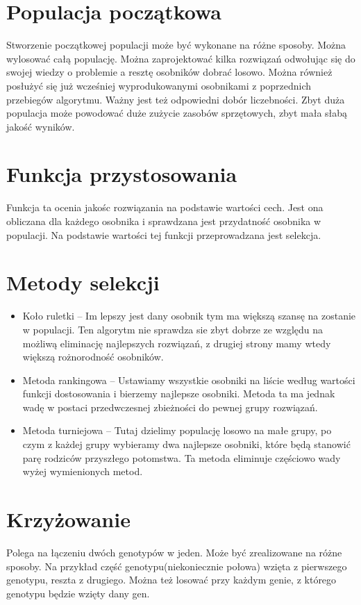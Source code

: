 \documentclass[bibtotocnumbered, headsepline,normalheadings,12pt,polish]{scrreprt}
\begin{document}
\section{ Populacja początkowa}
Stworzenie początkowej populacji może być wykonane na różne sposoby. Można wylosować całą populację. Można zaprojektować kilka rozwiązań odwołując się do swojej wiedzy o problemie a resztę osobników dobrać losowo. Można również posłużyć się już wcześniej wyprodukowanymi osobnikami z poprzednich przebiegów algorytmu. Ważny jest też odpowiedni dobór liczebności. Zbyt duża populacja może powodować duże zużycie zasobów sprzętowych, zbyt mała słabą jakość wyników.

\section{ Funkcja przystosowania}
 Funkcja ta ocenia jakośc rozwiązania na podstawie wartości cech. Jest ona obliczana dla każdego osobnika i sprawdzana jest przydatność osobnika w populacji. Na podstawie wartości tej funkcji przeprowadzana jest selekcja.

 \section{ Metody selekcji}
\begin{itemize}
    \item Koło ruletki – Im lepszy jest dany osobnik tym ma większą szansę na zostanie w populacji. Ten algorytm nie sprawdza sie zbyt dobrze ze względu na możliwą eliminację najlepszych rozwiązań, z drugiej strony mamy wtedy większą rożnorodność osobników.
    \item Metoda rankingowa – Ustawiamy wszystkie osobniki na liście według wartości funkcji dostosowania i bierzemy najlepsze osobniki. Metoda ta ma jednak wadę w postaci przedwczesnej zbieżności do pewnej grupy rozwiązań. 
    \item Metoda turniejowa – Tutaj dzielimy populację losowo na małe grupy, po czym z każdej grupy wybieramy dwa najlepsze osobniki, które będą stanowić parę rodziców przyszłego potomstwa. Ta metoda eliminuje częściowo wady wyżej wymienionych metod.
\end{itemize}
\section{ Krzyżowanie}
Polega na łączeniu dwóch genotypów w jeden. Może być zrealizowane na różne sposoby. Na przykład część genotypu(niekoniecznie połowa) wzięta z pierwszego genotypu, reszta z drugiego. Można też losować przy każdym genie, z którego genotypu będzie wzięty dany gen.
\end{document}
